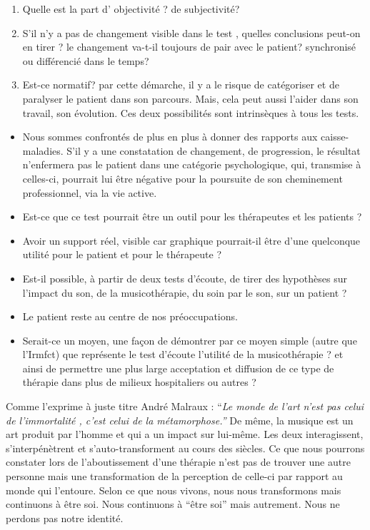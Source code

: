 \begin{enumerate}
\item Quelle est la part d' objectivité ? de subjectivité?
\item S'il n'y a pas de changement visible dans le test , quelles conclusions
peut-on en tirer ? le changement va-t-il toujours de pair avec le
patient? synchronisé ou différencié dans le temps?
\item Est-ce normatif? par cette démarche, il y a le risque de catégoriser
et de paralyser le patient dans son parcours. Mais, cela peut aussi
l'aider dans son travail, son évolution. Ces deux possibilités sont
intrinsèques à tous les tests.
\end{enumerate}
\begin{itemize}
\item Nous sommes confrontés de plus en plus à donner des rapports aux caisse-maladies.
S'il y a une constatation de changement, de progression, le résultat
n'enfermera pas le patient dans une catégorie psychologique, qui,
transmise à celles-ci, pourrait lui être négative pour la poursuite
de son cheminement professionnel, via la vie active. 
\item Est-ce que ce test pourrait être un outil pour les thérapeutes et
les patients ? 
\item Avoir un support réel, visible car graphique pourrait-il être d'une
quelconque utilité pour le patient et pour le thérapeute ?
\item Est-il possible, à partir de deux tests d'écoute, de tirer des hypothèses
sur l'impact du son, de la musicothérapie, du soin par le son, sur
un patient ?
\item Le patient reste au centre de nos préoccupations.
\item Serait-ce un moyen, une façon de démontrer par ce moyen simple (autre
que l'Irmfct) que représente le test d'écoute l'utilité de la musicothérapie
? et ainsi de permettre une plus large acceptation et diffusion de
ce type de thérapie dans plus de milieux hospitaliers ou autres ?


\end{itemize}

Comme l'exprime à juste titre André Malraux : ``\emph{Le monde de
	l'art n'est pas celui de l'immortalité , c'est celui de la métamorphose.''}
De même, la musique est un art produit par l'homme et qui a un impact
sur lui-même. Les deux interagissent, s'interpénètrent et s'auto-transforment
au cours des siècles. Ce que nous pourrons constater lors de l'aboutissement
d'une thérapie n'est pas de trouver une autre personne mais une transformation
de la perception de celle-ci par rapport au monde qui l'entoure. Selon
ce que nous vivons, nous nous transformons mais continuons à être
soi. Nous continuons à ``être soi'' mais autrement. Nous ne perdons
pas notre identité.

